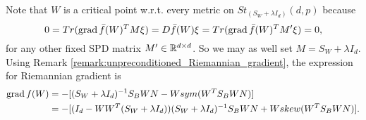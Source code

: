 \documentclass[11pt,a4paper]{article}
\begin{document}
\begin{remark}
Note that $W$ is a critical point w.r.t. every metric on $St_{(S_W+\lambda I_d)}(d,p)$ because 
\begin{equation*}
0 = Tr(\text{grad}\,\bar{f}(W)^TM\xi) = D\bar{f}(W)\xi = Tr(\text{grad}\,\bar{f}(W)^TM'\xi) = 0,    
\end{equation*}
for any other fixed SPD matrix $M'\in \mathbb{R}^{d\times d}$. So we may as well set $M = S_W+\lambda I_d$. Using Remark \ref{remark:unpreconditioned_Riemannian_gradient}, the expression for Riemannian gradient is
\begin{align*}
\text{grad}\, f(W) &= -[(S_W+\lambda I_d)^{-1}S_BWN - Wsym(W^TS_BWN)]\\ 
&= -[(I_d-WW^T(S_W+\lambda I_d))(S_W+\lambda I_d)^{-1}S_BWN + Wskew(W^TS_BWN)].
\end{align*}
\end{remark}
\end{document}
